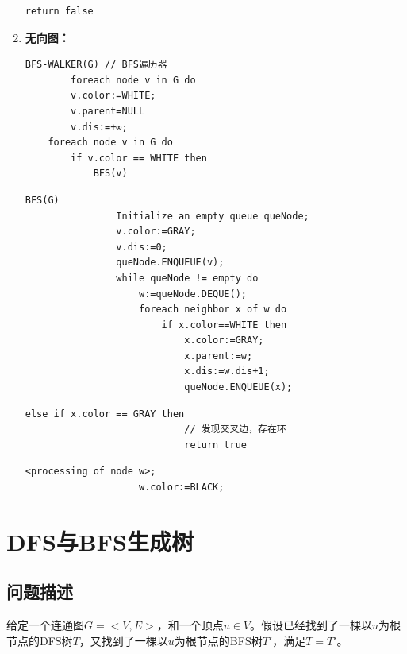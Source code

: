 \documentclass{article}
\begin{document}
\begin{enumerate}
\begin{lstlisting}[style=algorithm]
        return false
    \end{lstlisting}


    \item \textbf{无向图：\\}

    \begin{lstlisting}[style=algorithmPPT]
    BFS-WALKER(G) // BFS遍历器
        foreach node v in G do
        v.color:=WHITE; 
        v.parent=NULL 
        v.dis:=+∞;
    foreach node v in G do
        if v.color == WHITE then
            BFS(v)
    \end{lstlisting}

    \begin{lstlisting}[style=algorithmPPT]
            BFS(G)
                Initialize an empty queue queNode;
                v.color:=GRAY;
                v.dis:=0;
                queNode.ENQUEUE(v);
                while queNode != empty do
                    w:=queNode.DEQUE();
                    foreach neighbor x of w do
                        if x.color==WHITE then
                            x.color:=GRAY;
                            x.parent:=w;
                            x.dis:=w.dis+1;
                            queNode.ENQUEUE(x);
                    \end{lstlisting}

    \begin{lstlisting}[style=algorithm]
                        else if x.color == GRAY then
                            // 发现交叉边，存在环
                            return true
                        \end{lstlisting}

    \begin{lstlisting}[style=algorithmPPT]
                    <processing of node w>;
                    w.color:=BLACK;
                \end{lstlisting}
\end{enumerate}

\pagebreak

\section{DFS与BFS生成树}
\subsection{问题描述}

给定一个连通图$G=<V,E>$，和一个顶点$u\in V$。假设已经找到了一棵以$u$为根节点的DFS树$T$，又找到了一棵以$u$为根节点的BFS树$T'$，满足$T=T'$。
\end{document}
